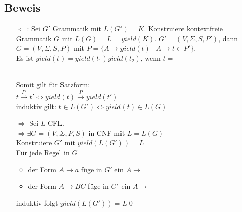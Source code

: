         \subsection{Beweis}
            \begin{itemize}
                \item[$\Leftarrow$:] Sei $G'$ Grammatik mit $L(G')=K$. Konstruiere kontextfreie Grammatik $G$ mit $L(G)=L=yield(K)$. $G'=(V,\Sigma,S,P')$, dann $G=(V,\Sigma,S,P)$ mit $P=\{A\rightarrow yield(t)\mid A\rightarrow t\in P'\}$.\\Es ist $yield(t)=yield(t_1)yield(t_2)$, wenn $t=$\vspace*{-.5cm}\\\hspace*{7cm}\\
                Somit gilt für Satzform:\\
                $t\overset{P'}{\rightarrow}t'\Leftrightarrow yield(t)\overset{P}{\rightarrow} yield(t')$\\
                induktiv gilt: $t\in L(G')\Leftrightarrow yield(t)\in L(G)$
                \item[$\Rightarrow$] Sei $L$ CFL.\\
                $\Rightarrow\exists G=(V,\Sigma,P,S)$ in CNF mit $L=L(G)$\\
                Konstruiere $G'$ mit $yield(L(G'))=L$\\
                Für jede Regel in $G$\begin{itemize}
                    \item der Form $A\rightarrow a$ füge in $G'$ ein $A\rightarrow$
                    \item der Form $A\rightarrow BC$ füge in $G'$ ein $A\rightarrow$
                \end{itemize}
                induktiv folgt $yield(L(G'))=L$\qed
            \end{itemize}
